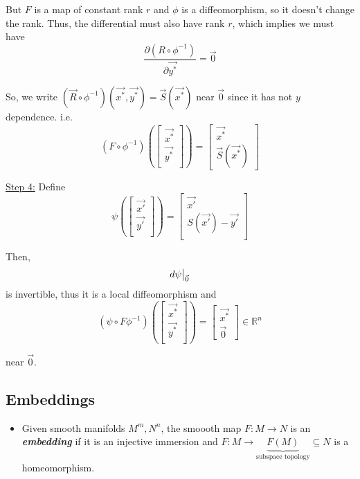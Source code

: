 \documentclass{article}
\newcommand{\R}{\mathbb{R}}
\newcommand{\restr}[2]{{%
  \left.\kern-\nulldelimiterspace %
  #1 %
  \vphantom{\big|} %
  \right|_{#2} %
  }}
\begin{document}
But $F$ is a map of constant rank $r$ and $\phi$ is a diffeomorphism, so it doesn't change the rank. Thus, the differential must also have rank $r$, which implies we must have 
\[ \frac{\partial (R \circ \phi^{-1})}{\partial \vec{y^*}} = \vec{0} \]

So, we write $\left( \vec{R} \circ \phi^{-1} \right)\left( \vec{x^*}, \vec{y^*} \right) = \vec{S}(\vec{x^{*}})$ near $\vec{0}$ since it has not $y$ dependence.
i.e. 
\[ \left( F \circ \phi^{-1} \right) \left( \begin{bmatrix}
  \vec{x^*} \\
  \vec{y^*} \\
\end{bmatrix} \right) = \begin{bmatrix}
  \vec{x^*} \\
  \vec{S}\left(\vec{x^*} \right)
\end{bmatrix} \]

\vskip 0.25cm
\underline{Step 4:} Define 
\[ \psi(\begin{bmatrix}
  \vec{x'} \\
  \vec{y'} \\
\end{bmatrix}) = \begin{bmatrix}
  \vec{x'} \\
  S\left(\vec{x'}\right) - \vec{y'} \\
\end{bmatrix} \]

Then, 
\[ \restr{d\psi}{\vec{0}} \]
is invertible, thus it is a local diffeomorphism and 
\[ \left( \psi \circ F \phi^{-1} \right) \left( \begin{bmatrix}
  \vec{x^*} \\
  \vec{y^*} \\
\end{bmatrix} \right) = \begin{bmatrix}
  \vec{x^*} \\
  \vec{0} 
\end{bmatrix} \in \R^{n} \]

near $\vec{0}$.

\vskip 0.1cm
\subsection{Embeddings}

\begin{mathdefinitionbox}{}
  \begin{itemize}
    \item Given smooth manifolds $M^m, N^n$, the smoooth map $F : M \rightarrow N$ is an \emph{\textbf{embedding}} if it is an injective immersion and $F : M \rightarrow \underbrace{F(M)}_{\text{subspace topology}} \subseteq N$ is a homeomorphism.
  \end{itemize}
\end{mathdefinitionbox}
\end{document}
